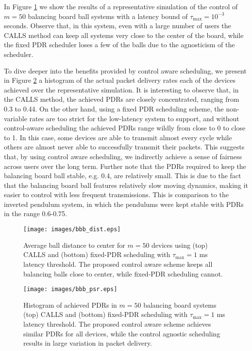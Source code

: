In Figure \ref{fig_bbb_dist} we show the results of a representative simulation of the control of $m=50$ balancing board ball systems with a latency bound of $\tau_{\max} = 10^{-3}$ seconds. Observe that, in this system, even with a large number of users the CALLS method can keep all systems very close to the center of the board, while the fixed PDR scheduler loses a few of the balls due to the agnosticism of the scheduler.

 To dive deeper into the benefits provided by control aware scheduling, we present in Figure \ref{fig_bbb_psr} a histogram of the actual  packet delivery rates each of the devices achieved over the representative simulation. It is interesting to observe that, in the CALLS method, the achieved PDRs are closely concentrated, ranging from 0.3 to 0.44. On the other hand, using a fixed PDR scheduling scheme, the non-variable rates are too strict for the low-latency system to support, and without control-aware scheduling the achieved PDRs range wildly from close to 0 to close to 1. In this case, some devices are able to transmit almost every cycle while others are almost never able to successfully transmit their packets. This suggests that, by using control aware scheduling, we indirectly achieve a sense of fairness across users over the long term. Further note that the PDRs required to keep the balancing board ball stable, e.g. 0.4, are relatively small. This is due to the fact that the balancing board ball features relatively slow moving dynamics, making it easier to control with less frequent transmissions. This is comparison to the inverted pendulum system, in which the pendulums were kept stable with PDRs in the range 0.6-0.75.

\begin{figure}
\centering
\texttt{[image: images/bbb\_dist.eps]}
\caption{Average ball distance to center for $m=50$ devices using (top) CALLS and (bottom) fixed-PDR scheduling with $\tau_{\max} =1$ ms latency threshold. The proposed control aware scheme keeps all balancing balls close to center, while fixed-PDR scheduling cannot.}
\label{fig_bbb_dist}
\end{figure}

\begin{figure}
\centering
\texttt{[image: images/bbb\_psr.eps]}
\caption{Histogram of achieved PDRs in $m=50$ balancing board systems (top) CALLS and (bottom) fixed-PDR scheduling with $\tau_{\max} =1$ ms latency threshold. The proposed control aware scheme achieves similar PDRs for all devices, while the control agnostic scheduling results in large variation in packet delivery.}
\label{fig_bbb_psr}
\end{figure}

